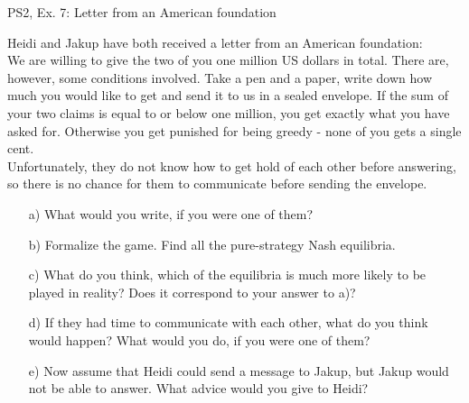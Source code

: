 \begin{frame}{PS2, Ex. 7: Letter from an American foundation}
  \begin{multicols}{2}
    Heidi and Jakup have both received a letter from an American foundation:\\\medskip
    We are willing to give the two of you one million US dollars in total. There are, however, some conditions involved. Take a pen and a paper, write down how much you would like to get and send it to us in a sealed envelope. If the sum of your two claims is equal to or below one million, you get exactly what you have asked for. Otherwise you get punished for being greedy - none of you gets a single cent.\\\medskip
    Unfortunately, they do not know how to get hold of each other before answering, so there is no chance for them to communicate before sending the envelope.
  \vfill\null \columnbreak
    \begin{itemize}
      \item[a)] What would you write, if you were one of them?
      \item[b)] Formalize the game. Find all the pure-strategy Nash equilibria.
      \item[c)] What do you think, which of the equilibria is much more likely to be played in reality? Does it correspond to your answer to a)?
      \item[d)] If they had time to communicate with each other, what do you think would happen? What would you do, if you were one of them?
      \item[e)] Now assume that Heidi could send a message to Jakup, but Jakup would not be able to answer. What advice would you give to Heidi?
    \end{itemize}
  \vfill\null
  \end{multicols}
\end{frame}
